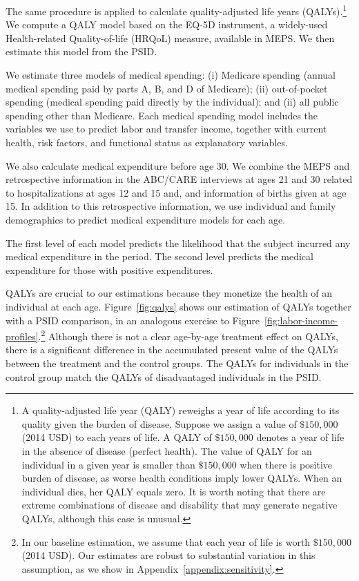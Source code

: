 The same procedure is applied to calculate quality-adjusted life years (QALYs).\footnote{A quality-adjusted life year (QALY) reweighs a year of life according to its quality given the burden of disease. Suppose we assign a value of $\$150,000$ (2014 USD) to each years of life. A QALY of $\$150,000$ denotes a year of life in the absence of disease (perfect health). The value of QALY for an individual in a given year is smaller than $\$150,000$ when there is positive burden of disease, as worse health conditions imply lower QALYs. When an individual dies, her QALY equals zero. It is worth noting that there are extreme combinations of disease and disability that may generate negative QALYs, although this case is unusual.} We compute a QALY model based on the EQ-5D instrument, a widely-used Health-related Quality-of-life (HRQoL) measure, available in MEPS. We then estimate this model from the PSID.

We estimate three models of medical spending: (i) Medicare spending (annual medical spending paid by parts A, B, and D of Medicare); (ii) out-of-pocket spending (medical spending paid directly by the individual); and (ii) all public spending other than Medicare. Each medical spending model includes the variables we use to predict labor and transfer income, together with current health, risk factors, and functional status as explanatory variables.

We also calculate medical expenditure before age 30. We combine the MEPS and retrospective information in the ABC/CARE interviews at ages 21 and 30 related to hospitalizations at ages 12 and 15 and, and information of births given at age 15. In addition to this retrospective information, we use individual and family demographics to predict medical expenditure models for each age.

The first level of each model predicts the likelihood that the subject incurred any medical expenditure in the period. The second level predicts the medical expenditure for those with positive expenditures.

QALYs are crucial to our estimations because they monetize the health of an individual at each age. Figure~\ref{fig:qalys} shows our estimation of QALYs together with a PSID comparison, in an analogous exercise to Figure~\ref{fig:labor-income-profiles}.\footnote{In our baseline estimation, we assume that each year of life is worth  $\$150,000$ (2014 USD). Our estimates are robust to substantial variation in this assumption, as we show in Appendix~\ref{appendix:sensitivity}.} Although there is not a clear age-by-age treatment effect on QALYs, there is a significant difference in the accumulated present value of the QALYs between the treatment and the control groups. The QALYs for individuals in the control group match the QALYs of disadvantaged individuals in the PSID.

